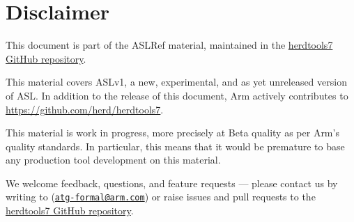 \chapter{Disclaimer}

This document is part of the ASLRef material, maintained in the
\href{https://github.com/herd/herdtools7}{herdtools7 GitHub repository}.

This material covers ASLv1, a new, experimental, and as yet unreleased version of ASL.
In addition to the release of this document, Arm actively contributes to
\url{https://github.com/herd/herdtools7}.

This material is work in progress, more precisely at Beta quality as
per Arm’s quality standards. In particular, this means that it would be
premature to base any production tool development on this material.

We welcome feedback, questions, and feature requests — please contact us by writing
to (\href{mailto:atg-formal@arm.com}{\tt atg-formal@arm.com}) or raise issues and
pull requests to the \href{https://github.com/herd/herdtools7}{herdtools7 GitHub repository}.
